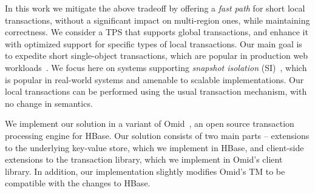 In this work we mitigate the above tradeoff by offering a \emph{fast path} for short
local transactions, without a significant impact on multi-region ones, while
maintaining correctness. We consider a TPS that supports global
transactions, and enhance it with optimized support for specific types of local
transactions. Our main goal is to expedite short single-object transactions,
which are popular in production web workloads~\cite{sieve}.
%
We focus here on systems supporting \emph{snapshot isolation} (SI)~\cite{DBLP:conf/sigmod/BerensonBGMOO95}, which is
popular in real-world systems  and amenable to scalable implementations.
Our local transactions can be performed using the usual
transaction mechanism, with no change in semantics.

We implement our solution in a variant of Omid~\cite{Omid-git}, an open source transaction processing engine for HBase. 
Our solution consists of two main parts -- extensions to the underlying key-value store, which we implement in HBase, and client-side
extensions to the transaction library, which we implement in Omid's client library. 
In addition, our implementation slightly modifies Omid's TM to be compatible with the changes to HBase.
 
 
